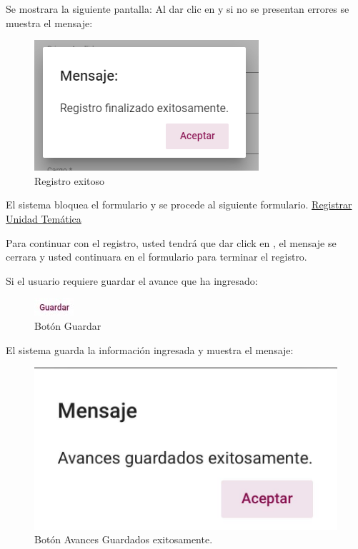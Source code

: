 Se mostrara la siguiente pantalla:
Al dar clic en  y si no se presentan errores se muestra el mensaje:


\begin{figure}[H]
    \centering
    \includegraphics[width=0.4\linewidth]{images/SP6/MSG5.png}
    \caption{Registro exitoso}
    \label{mensaje5}
\end{figure}


El sistema bloquea el formulario y se procede al siguiente formulario. \hyperlink{RegUT}{Registrar Unidad Temática}


Para continuar con el registro, usted tendrá que  dar click en , el mensaje se cerrara y usted continuara
en el formulario para terminar el registro.

\pagebreak
Si el usuario requiere guardar el avance que ha ingresado:

\begin{figure}[H]
    \centering
    \includegraphics[width=0.1\linewidth]{images/SP6/BotonGuardar.jpeg}
    \caption{Botón Guardar}
\end{figure}

El sistema guarda la información ingresada y muestra el mensaje:

\begin{figure}[H]
    \centering
    \includegraphics[width=0.4\linewidth]{images/SP6/BotonAvance.jpeg}
    \caption{Botón Avances Guardados exitosamente.}
\end{figure}

